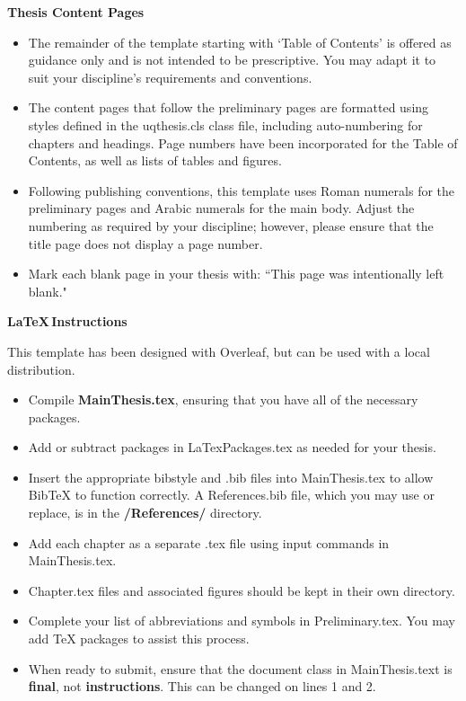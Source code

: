 \vspace{0.3em}

\noindent
\textbf{\large Thesis Content Pages}   
\begin{itemize}
\itemsep0em 
    \item The remainder of the template starting with ‘Table of Contents’ is offered as guidance only and is not intended to be prescriptive. You may adapt it to suit your discipline's requirements and conventions.
    \item The content pages that follow the preliminary pages are formatted using styles defined in the uqthesis.cls class file, including auto-numbering for chapters and headings. Page numbers have been incorporated for the Table of Contents, as well as lists of tables and figures.
    \item Following publishing conventions, this template uses Roman numerals for the preliminary pages and Arabic numerals for the main body. Adjust the numbering as required by your discipline; however, please ensure that the title page does not display a page number.
    \item Mark each blank page in your thesis with: ``This page was intentionally left blank."
\end{itemize}

\clearpage
\noindent
\textbf{\large \LaTeX \,Instructions}

\noindent
This template has been designed with Overleaf, but can be used with a local distribution.
\begin{itemize}
    \item Compile \textbf{MainThesis.tex}, ensuring that you have all of the necessary packages.
    \item Add or subtract packages in LaTexPackages.tex as needed for your thesis.
    \item Insert the appropriate bibstyle and .bib files into MainThesis.tex to allow BibTeX to function correctly. A References.bib file, which you may use or replace, is in the \textbf{/References/} directory.
    \item Add each chapter as a separate .tex file using input commands in MainThesis.tex. 
    \item Chapter.tex files and associated figures should be kept in their own directory. 
    \item Complete your list of abbreviations and symbols in Preliminary.tex. You may add TeX packages to assist this process.
    \item When ready to submit, ensure that the document class in MainThesis.text is \textbf{final}, not \textbf{instructions}. This can be changed on lines 1 and 2.
\end{itemize}


